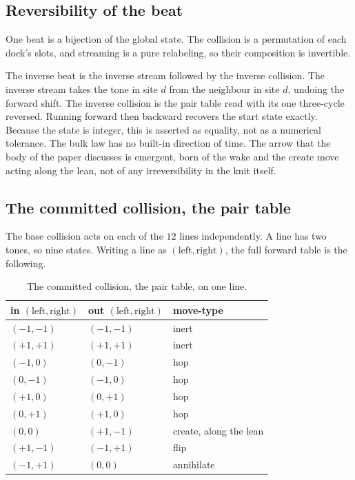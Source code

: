 \subsection{Reversibility of the beat}

\begin{theorem}
One beat is a bijection of the global state. The collision is a permutation of each dock's slots, and streaming is a pure relabeling, so their composition is invertible.
\end{theorem}

The inverse beat is the inverse stream followed by the inverse collision. The inverse stream takes the tone in site $d$ from the neighbour in site $d$, undoing the forward shift. The inverse collision is the pair table read with its one three-cycle reversed. Running forward then backward recovers the start state exactly. Because the state is integer, this is asserted as equality, not as a numerical tolerance. The bulk law has no built-in direction of time. The arrow that the body of the paper discusses is emergent, born of the wake and the create move acting along the lean, not of any irreversibility in the knit itself.

\subsection{The committed collision, the pair table}

The base collision acts on each of the $12$ lines independently. A line has two tones, so nine states. Writing a line as $(\mathrm{left}, \mathrm{right})$, the full forward table is the following.

\begin{table}[ht]
\centering
\begin{tabular}{@{}lll@{}}
\toprule
in $(\mathrm{left}, \mathrm{right})$ & out $(\mathrm{left}, \mathrm{right})$ & move-type \\
\midrule
$(-1, -1)$ & $(-1, -1)$ & inert \\
$(+1, +1)$ & $(+1, +1)$ & inert \\
$(-1, 0)$ & $(0, -1)$ & hop \\
$(0, -1)$ & $(-1, 0)$ & hop \\
$(+1, 0)$ & $(0, +1)$ & hop \\
$(0, +1)$ & $(+1, 0)$ & hop \\
$(0, 0)$ & $(+1, -1)$ & create, along the lean \\
$(+1, -1)$ & $(-1, +1)$ & flip \\
$(-1, +1)$ & $(0, 0)$ & annihilate \\
\bottomrule
\end{tabular}
\caption{The committed collision, the pair table, on one line.}
\label{tab:pair-table}
\end{table}

